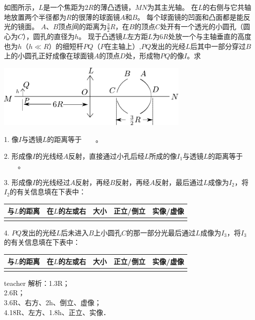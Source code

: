 \begin{example}
如图所示，$L$是一个焦距为$2R$的薄凸透镜，$MN$为其主光轴。
在$L$的右侧与它共轴地放置两个半径都为$R$的很薄的球面镜$A$和$B$。
每个球面镜的凹面和凸面都是能反光的镜面。
$A$、$B$顶点间的距离为$\frac{3}{2}R$，在$B$的顶点$C$处开有一个透光的小圆孔（圆心为$C$），圆孔的直径为$h$。
现于凸透镜$L$左方距$L$为$6R$处放一个与主轴垂直的高度也为$h$（$h\ll R$）的细短杆$PQ$（$P$在主轴上）,$PQ$发出的光经$L$后其中一部分穿过$B$上的小圆孔正好成像在球面镜$A$的顶点$D$处，形成物$PQ$的像$I$。求

\begin{center}
\includegraphics[width=0.7\textwidth]{images/lense-comples-problem.pdf}
\end{center}


1. 像$I$与透镜$L$的距离等于\underline{$\qquad$}。

2. 形成像$I$的光线经$A$反射，直接通过小孔后经$L$所成的像$I_1$与透镜$L$的距离等于\underline{$\qquad$}。

3. 形成像$I$的光线经过$A$反射，再经$B$反射，再经$A$反射，最后通过$L$成像为$I_2$，将$I_2$的有关信息填在下表中：

\begin{tabular}{|c|c|c|c|c|}
\hline 
与$L$的距离 & 在$L$的左或右 & 大小 & 正立/倒立 & 实像/虚像 \\ 
\hline 
 &  &  &  &  \\ 
\hline 
\end{tabular} 

4. $PQ$发出的光经$L$后未进入$B$上小圆孔$C$的那一部分光最后通过$L$成像为$I_3$，将$I_3$的有关信息填在下表中：

\begin{tabular}{|c|c|c|c|c|}
\hline 
与$L$的距离 & 在$L$的左或右 & 大小 & 正立/倒立 & 实像/虚像 \\ 
\hline 
 &  &  &  &  \\ 
\hline 
\end{tabular} 

\begin{taggedblock}{teacher}
\noindent
解析：1.3R；
\\2.6R；
\\3.6R、右方、2h、倒立、虚像；
\\4.18R、左方、1.8h、正立、实像．
\end{taggedblock}
\end{example}





